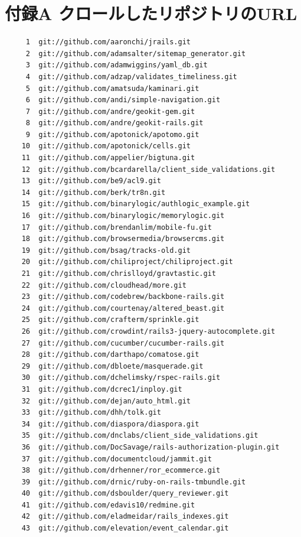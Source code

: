 \documentclass{cs-thesis}
\begin{document}
  \clearpage

\def\thesection{}
\setcounter{section}{0}
\section{付録A クロールしたリポジトリのURL}


\begin{verbatim}
     1	git://github.com/aaronchi/jrails.git
     2	git://github.com/adamsalter/sitemap_generator.git
     3	git://github.com/adamwiggins/yaml_db.git
     4	git://github.com/adzap/validates_timeliness.git
     5	git://github.com/amatsuda/kaminari.git
     6	git://github.com/andi/simple-navigation.git
     7	git://github.com/andre/geokit-gem.git
     8	git://github.com/andre/geokit-rails.git
     9	git://github.com/apotonick/apotomo.git
    10	git://github.com/apotonick/cells.git
    11	git://github.com/appelier/bigtuna.git
    12	git://github.com/bcardarella/client_side_validations.git
    13	git://github.com/be9/acl9.git
    14	git://github.com/berk/tr8n.git
    15	git://github.com/binarylogic/authlogic_example.git
    16	git://github.com/binarylogic/memorylogic.git
    17	git://github.com/brendanlim/mobile-fu.git
    18	git://github.com/browsermedia/browsercms.git
    19	git://github.com/bsag/tracks-old.git
    20	git://github.com/chiliproject/chiliproject.git
    21	git://github.com/chrislloyd/gravtastic.git
    22	git://github.com/cloudhead/more.git
    23	git://github.com/codebrew/backbone-rails.git
    24	git://github.com/courtenay/altered_beast.git
    25	git://github.com/crafterm/sprinkle.git
    26	git://github.com/crowdint/rails3-jquery-autocomplete.git
    27	git://github.com/cucumber/cucumber-rails.git
    28	git://github.com/darthapo/comatose.git
    29	git://github.com/dbloete/masquerade.git
    30	git://github.com/dchelimsky/rspec-rails.git
    31	git://github.com/dcrec1/inploy.git
    32	git://github.com/dejan/auto_html.git
    33	git://github.com/dhh/tolk.git
    34	git://github.com/diaspora/diaspora.git
    35	git://github.com/dnclabs/client_side_validations.git
    36	git://github.com/DocSavage/rails-authorization-plugin.git
    37	git://github.com/documentcloud/jammit.git
    38	git://github.com/drhenner/ror_ecommerce.git
    39	git://github.com/drnic/ruby-on-rails-tmbundle.git
    40	git://github.com/dsboulder/query_reviewer.git
    41	git://github.com/edavis10/redmine.git
    42	git://github.com/eladmeidar/rails_indexes.git
    43	git://github.com/elevation/event_calendar.git

\end{verbatim}
\end{document}
